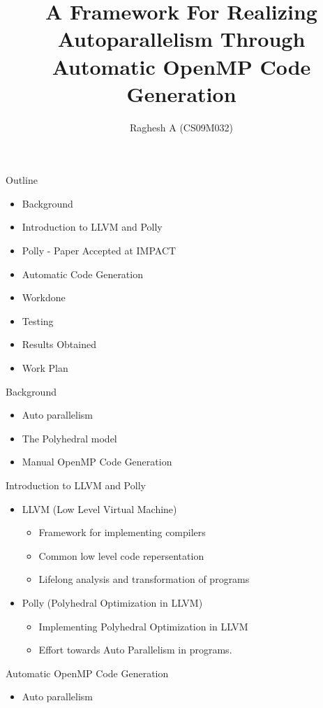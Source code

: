 \documentclass{beamer}
\title{A Framework For Realizing Autoparallelism
Through Automatic OpenMP Code Generation
 }
\author{Raghesh A (CS09M032)}
\begin{document}
\begin{frame}
\titlepage
\end{frame}

\begin{frame}{Outline}
\begin{itemize}
\item Background
\item Introduction to LLVM and Polly
\item Polly - Paper Accepted at IMPACT
\item Automatic Code Generation
\item Workdone
\item Testing
\item Results Obtained
\item Work Plan
\end{itemize}
\end{frame}

\begin{frame}{Background}
\begin{itemize}
\item Auto parallelism
\item The Polyhedral model
\item Manual OpenMP Code Generation
\end{itemize}
\end{frame}

\begin{frame}{Introduction to LLVM and Polly}
\begin{itemize}
\item LLVM (Low Level Virtual Machine)
	\begin{itemize}
	\item Framework for implementing compilers
	\item Common low level code repersentation
	\item Lifelong analysis and transformation of programs
	\end{itemize}
\item Polly (Polyhedral Optimization in LLVM)
	\begin{itemize}
	\item Implementing Polyhedral Optimization in LLVM
	\item Effort towards Auto Parallelism in programs.
	\end{itemize}
\end{itemize}
\end{frame}

\begin{frame}{Automatic OpenMP Code Generation}
\begin{itemize}
\item Auto parallelism
\end{itemize}
\end{frame}
\end{document}
